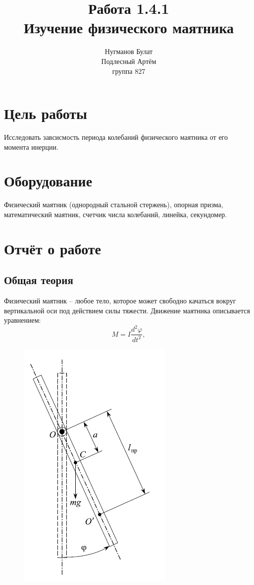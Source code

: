 \documentclass[a4paper, 10pt]{article}%
\author{Нугманов Булат \\ Подлесный Артём \\ группа 827}
\title{Работа 1.4.1 \\ Изучение физического маятника}
\begin{document}
\maketitle
\section*{Цель работы}
Исследовать завсисмость периода колебаний физического маятника от его момента инерции.
\section*{Оборудование}
Физический маятник (однородный стальной стержень), опорная призма,
математический маятник, счетчик числа колебаний, линейка, секундомер.
\section*{Отчёт о работе}
\subsection*{Общая теория}
Физический маятник – любое тело, которое может свободно качаться вокруг вертикальной оси под действием силы тяжести. Движение маятника описывается уравнением:
\begin{equation}
M=I\frac{d^2 \varphi}{dt^2},
\end{equation}
\begin{figure}
\center
\caption{}
\includegraphics[scale=0.5]{Pic}
\end{figure}
\end{document}
